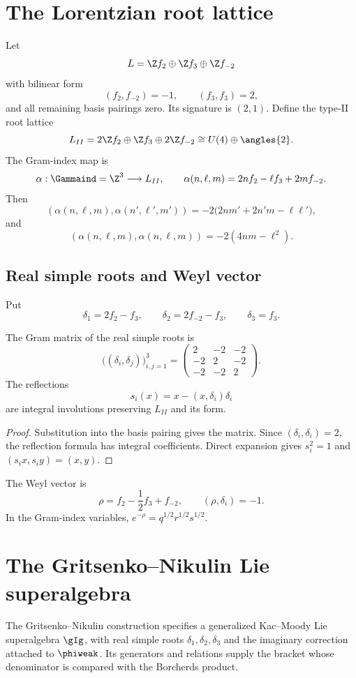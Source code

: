 \chapter{The Lorentzian root lattice}
Let
\[
 L=\Z f_2\oplus\Z f_3\oplus\Z f_{-2}
\]
with bilinear form
\[
 (f_2,f_{-2})=-1,
 \qquad (f_3,f_3)=2,
\]
and all remaining basis pairings zero. Its signature is $(2,1)$. Define the type-II root lattice
\[
 L_{II}=2\Z f_2\oplus\Z f_3\oplus2\Z f_{-2}
 \cong U(4)\oplus\angles{2}.
\]
The Gram-index map is
\[
 \alpha:\Gammaind=\Z^3\longrightarrow L_{II},
 \qquad
 \alpha(n,\ell,m)=2nf_2-\ell f_3+2mf_{-2}.
\]
Then
\[
 (\alpha(n,\ell,m),\alpha(n',\ell',m'))
 =-2\bigl(2nm'+2n'm-\ell\ell'\bigr),
\]
and
\[
 (\alpha(n,\ell,m),\alpha(n,\ell,m))
 =-2(4nm-\ell^2).
\]

\section{Real simple roots and Weyl vector}
Put
\[
 \delta_1=2f_2-f_3,
 \qquad
 \delta_2=2f_{-2}-f_3,
 \qquad
 \delta_3=f_3.
\]

\begin{proposition}
The Gram matrix of the real simple roots is
\[
 \bigl((\delta_i,\delta_j)\bigr)_{i,j=1}^3
 =\begin{pmatrix}
 2&-2&-2\\
 -2&2&-2\\
 -2&-2&2
 \end{pmatrix}.
\]
The reflections
\[
 s_i(x)=x-(x,\delta_i)\delta_i
\]
are integral involutions preserving $L_{II}$ and its form.
\end{proposition}
\begin{proof}
Substitution into the basis pairing gives the matrix. Since $(\delta_i,\delta_i)=2$, the reflection formula has integral coefficients. Direct expansion gives $s_i^2=1$ and $(s_ix,s_iy)=(x,y)$.
\end{proof}

The Weyl vector is
\[
 \rho=f_2-\frac12f_3+f_{-2},
 \qquad (\rho,\delta_i)=-1.
\]
In the Gram-index variables, $e^{-\rho}=q^{1/2}r^{1/2}s^{1/2}$.

\chapter[The denominator algebra]{The Gritsenko--Nikulin Lie superalgebra}
The Gritsenko--Nikulin construction specifies a generalized
Kac--Moody Lie superalgebra \(\gIg\), with real simple roots
\(\delta_1,\delta_2,\delta_3\) and the imaginary correction
attached to \(\phiweak\). Its generators and relations supply the
bracket whose denominator is compared with the Borcherds product.

